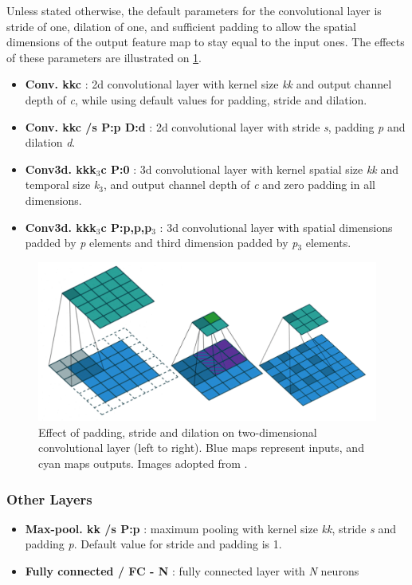 Unless stated otherwise, the default parameters for the convolutional layer is stride of one, dilation of one, and sufficient padding to allow the spatial dimensions of the output feature map to stay equal to the input ones. The effects of these parameters are illustrated on \cref{fig:convolutions}.

\begin{itemize}
    \item \textbf{Conv. k\x k\x c} : 2d convolutional layer with kernel size \textit{k\x k} and output channel depth of \textit{c}, while using default values for padding, stride and dilation.
    
    \item \textbf{Conv. k\x k\x c /s P:p D:d} : 2d convolutional layer with stride \textit{s}, padding \textit{p} and dilation \textit{d}. 
    
    \item \textbf{Conv3d. k\x k\x k$_3$\x c P:0} : 3d convolutional layer with kernel spatial size \textit{k\x k} and temporal size \textit{k$_3$}, and output channel depth of \textit{c} and zero padding in all dimensions. 
    
    \item \textbf{Conv3d. k\x k\x k$_3$\x c P:p,p,p$_3$} : 3d convolutional layer with spatial dimensions padded by \textit{p} elements and third dimension padded by \textit{p$_3$} elements.
\end{itemize}

\begin{figure}
    \centering
    \includegraphics[width=\textwidth]{img/convolutions}
    \caption[Parametrization of convolutional layer]{Effect of padding, stride and dilation on two-dimensional convolutional layer (left to right). Blue maps represent inputs, and cyan maps outputs. Images adopted from \citet{bib:convolution}.}
    \label{fig:convolutions}
\end{figure}

\subsubsection*{Other Layers}
\begin{itemize}
    \item \textbf{Max-pool. k\x k /s P:p} : maximum pooling with kernel size \textit{k\x k}, stride \textit{s} and padding \textit{p}. Default value for stride and padding is 1.
    
    \item \textbf{Fully connected / FC - N} : fully connected layer with \textit{N} neurons
\end{itemize}